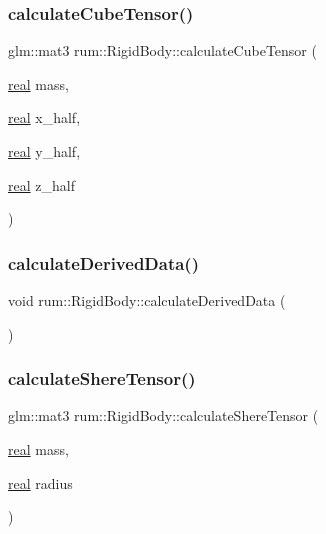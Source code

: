 \subsubsection{\texorpdfstring{calculate\+Cube\+Tensor()}{calculateCubeTensor()}}
{\footnotesize\ttfamily glm\+::mat3 rum\+::\+Rigid\+Body\+::calculate\+Cube\+Tensor (\begin{DoxyParamCaption}\item[{\hyperlink{namespacerum_a7e8cca23573d5eaead0f138cbaa4862c}{real}}]{mass,  }\item[{\hyperlink{namespacerum_a7e8cca23573d5eaead0f138cbaa4862c}{real}}]{x\+\_\+half,  }\item[{\hyperlink{namespacerum_a7e8cca23573d5eaead0f138cbaa4862c}{real}}]{y\+\_\+half,  }\item[{\hyperlink{namespacerum_a7e8cca23573d5eaead0f138cbaa4862c}{real}}]{z\+\_\+half }\end{DoxyParamCaption})}

\mbox{\label{classrum_1_1_rigid_body_a3f14dfc9bb7dcfc961373b8f7cb71dc9}} 
\subsubsection{\texorpdfstring{calculate\+Derived\+Data()}{calculateDerivedData()}}
{\footnotesize\ttfamily void rum\+::\+Rigid\+Body\+::calculate\+Derived\+Data (\begin{DoxyParamCaption}{ }\end{DoxyParamCaption})}

\mbox{\label{classrum_1_1_rigid_body_a93de6b632eb6da8fdaafaedb8ca249ab}} 
\subsubsection{\texorpdfstring{calculate\+Shere\+Tensor()}{calculateShereTensor()}}
{\footnotesize\ttfamily glm\+::mat3 rum\+::\+Rigid\+Body\+::calculate\+Shere\+Tensor (\begin{DoxyParamCaption}\item[{\hyperlink{namespacerum_a7e8cca23573d5eaead0f138cbaa4862c}{real}}]{mass,  }\item[{\hyperlink{namespacerum_a7e8cca23573d5eaead0f138cbaa4862c}{real}}]{radius }\end{DoxyParamCaption})}


